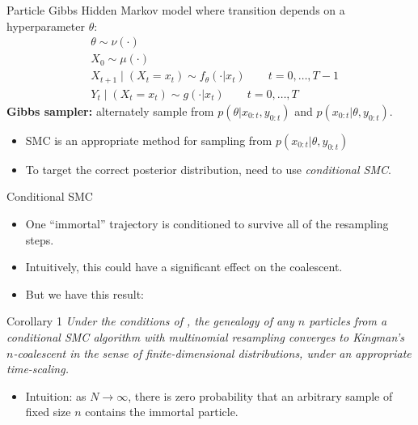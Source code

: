 \documentclass[aspectratio=169]{beamer}
\theoremstyle{definition}
\begin{document}
\begin{frame}{Particle Gibbs \citep{andrieu2010}}
Hidden Markov model where transition depends on a hyperparameter $\theta$:
\begin{align*}
& \theta \sim \nu(\cdot) \\
& X_0 \sim \mu(\cdot) \\
& X_{t+1} \mid (X_t = x_t) \sim f_{\theta}(\cdot | x_t)  \qquad t=0,\dots,T-1 \\
& Y_t \mid (X_t = x_t) \sim g(\cdot | x_t) \qquad t=0,\dots,T
\end{align*}
\pause
\textbf{Gibbs sampler:} alternately sample from $p(\theta | x_{0:t}, y_{0:t})$ and $p(x_{0:t} | \theta, y_{0:t})$.\\[7pt]
\pause
\begin{itemize}
\item SMC is an appropriate method for sampling from $p(x_{0:t} | \theta, y_{0:t})$
\item To target the correct posterior distribution, need to use \emph{conditional SMC}.
\end{itemize}
\end{frame}

\begin{frame}{Conditional SMC}
\begin{itemize}
\item One ``immortal'' trajectory is conditioned to survive all of the resampling steps.
\item Intuitively, this could have a significant effect on the coalescent. 
\pause
\item But we have this result:
\end{itemize}
\begin{block}{Corollary 1}
\textit{Under the conditions of \cite[Lemma 3]{koskela2018}
, the genealogy of any $n$ particles from a conditional SMC algorithm with multinomial resampling converges to Kingman's $n$-coalescent in the sense of finite-dimensional distributions, under an appropriate time-scaling.}
\end{block}
\pause
\begin{itemize}
\item Intuition: as $N\to\infty$, there is zero probability that an arbitrary sample of fixed size $n$ contains the immortal particle.
\end{itemize}
\end{frame}
\end{document}
